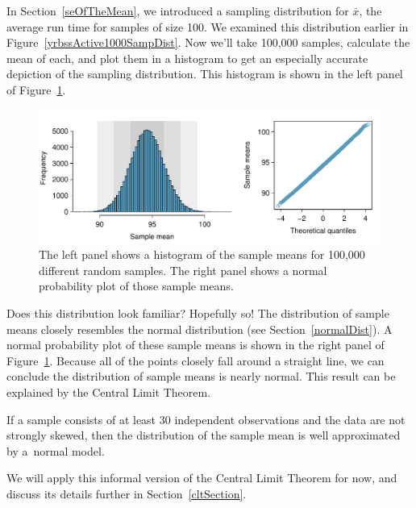 In Section~\ref{seOfTheMean}, we introduced a sampling distribution for $\bar{x}$, the average run time for samples of size 100. We examined this distribution earlier in Figure~\ref{yrbssActive1000SampDist}. Now we'll take 100,000 samples, calculate the mean of each, and plot them in a histogram to get an especially accurate depiction of the sampling distribution. This histogram is shown in the left panel of Figure~\ref{netTimeBigSamplingDistribution}.

\begin{figure}[hht]
   \centering
   \includegraphics[width=\textwidth]{ch_inference_foundations/figures/netTimeBigSamplingDistribution/netTimeBigSamplingDistribution}
   \caption{The left panel shows a histogram of the sample means for 100,000 different random samples. The right panel shows a normal probability plot of those sample means.}
   \label{netTimeBigSamplingDistribution}
\end{figure}

Does this distribution look familiar? Hopefully so! The distribution of sample means closely resembles the normal distribution (see Section~\ref{normalDist}). A normal probability plot of these sample means is shown in the right panel of Figure~\ref{netTimeBigSamplingDistribution}. Because all of the points closely fall around a straight line, we can conclude the distribution of sample means is nearly normal. This result can be explained by the Central Limit Theorem.

\begin{termBox}{
If a sample consists of at least 30 independent observations and the data are not strongly skewed, then the distribution of the sample mean is well approximated by a~normal model.}
\end{termBox}

We will apply this informal version of the Central Limit Theorem for now, and discuss its details further in Section~\ref{cltSection}.

